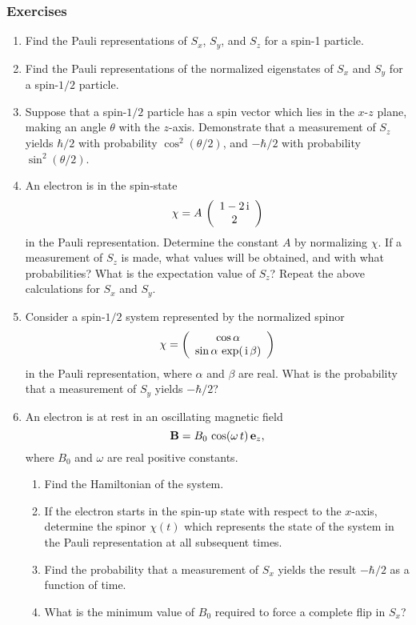 \subsubsection*{Exercises}
{\small
\begin{enumerate}
\item Find the Pauli representations of  $S_x$, $S_y$, and $S_z$ for a spin-1 particle.

\item  Find the Pauli representations of the normalized eigenstates of $S_x$ and $S_y$ for
a spin-$1/2$ particle. 
\item Suppose that a spin-$1/2$ particle
has a spin vector which lies in the $x$-$z$ plane, making an
angle $\theta$ with the $z$-axis. Demonstrate that a measurement of $S_z$
yields $\hbar/2$ with probability $\cos^2(\theta/2)$, and $-\hbar/2$
with probability $\sin^2(\theta/2)$. 

\item An electron is in the spin-state 
$$
\chi = A\,\left(\begin{array}{c}1-2\,{\rm i}\\2\end{array}\right)
$$
in the Pauli representation. Determine the constant $A$ by normalizing
$\chi$. If a measurement of $S_z$ is made, what values will be
obtained, and with what probabilities? What is the expectation
value of $S_z$? Repeat the above calculations for $S_x$ and $S_y$. 


\item Consider a spin-$1/2$ system represented by the normalized spinor
$$
\chi =\left(\begin{array}{c}\cos\alpha\\\sin\alpha\,\exp(\,{\rm i}\,\beta)\end{array}\right)
$$
in the Pauli representation, where $\alpha$ and $\beta$ are real. What is the probability that a measurement of
$S_y$ yields $-\hbar/2$? 

\item An electron is at rest in an oscillating magnetic field
$$
{\bf B} = B_0\,\cos(\omega\,t)\,{\bf e}_z,
$$
where $B_0$ and $\omega$ are real positive constants. 
\begin{enumerate}
\item Find the Hamiltonian of the system.
\item If the electron starts in the spin-up state with respect to the
$x$-axis, determine the spinor $\chi(t)$ which represents the state
of the system in the Pauli representation at all subsequent times.
\item Find the probability that a measurement of $S_x$ yields
the result $-\hbar/2$ as a function of time.
\item What is the minimum value of $B_0$ required to force a
complete flip in $S_x$?
\end{enumerate}
\end{enumerate}}